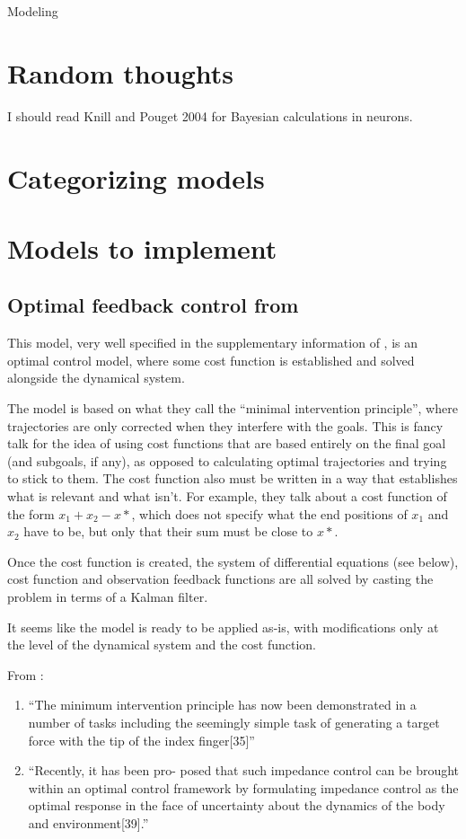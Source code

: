 \documentclass{report}
\begin{document}
\begin{chapter}{Modeling}
\section{Random thoughts}
I should read Knill and Pouget 2004 for Bayesian calculations in neurons.

\section{Categorizing models}

\section{Models to implement}
\subsection{Optimal feedback control from \cite{Todorov_Optimal_2002}}
\label{subsec:todorov-2002}
This model, very well specified in the supplementary information of
\cite{Todorov_Optimal_2002}, is an optimal control model, where some cost
function is established and solved alongside the dynamical system.

The model is based on what they call the ``minimal intervention principle'',
where trajectories are only corrected when they interfere with the goals. This
is fancy talk for the idea of using cost functions that are based entirely on
the final goal (and subgoals, if any), as opposed to calculating optimal
trajectories and trying to stick to them. The cost function also must be written
in a way that establishes what is relevant and what isn't. For example, they
talk about a cost function of the form $x_1 + x_2 - x*$, which does not specify
what the end positions of $x_1$ and $x_2$ have to be, but only that their sum
must be close to $x*$.

Once the cost function is created, the system of differential equations (see
below), cost function and observation feedback functions are all solved by
casting the problem in terms of a Kalman filter.

It seems like the model is ready to be applied as-is, with modifications only at
the level of the dynamical system and the cost function.

From \cite{Wolpert_Principles_2011}:
\begin{enumerate}
\item ``The minimum intervention principle has now
been demonstrated in a number of tasks including the seemingly simple task of
generating a target force with the tip of the index finger[35]''
\item ``Recently, it has been pro- posed that such impedance control can be
brought within an optimal control framework by formulating impedance control as
the optimal response in the face of uncertainty about the dynamics of the body
and environment[39].''
\end{enumerate}


\end{chapter}
\end{document}
